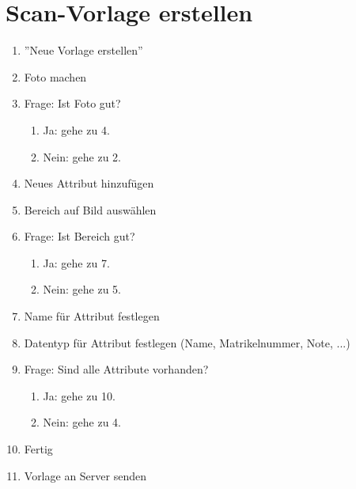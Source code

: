 \documentclass[notables, nomenclature, oneside, 150]{HSMW-Thesis}
\begin{document}
	\section*{Scan-Vorlage erstellen}
	\begin{enumerate}
		\item ''Neue Vorlage erstellen''
		\item Foto machen
		\item Frage: Ist Foto gut?
		\vspace{-5mm}
		\begin{enumerate}
			\item Ja: gehe zu 4.
			\item Nein: gehe zu 2.
		\end{enumerate}
		\item Neues Attribut hinzufügen
		\item Bereich auf Bild auswählen
		\item Frage: Ist Bereich gut?
		\vspace{-5mm}
		\begin{enumerate}
			\item Ja: gehe zu 7.
			\item Nein: gehe zu 5.
		\end{enumerate}
		\item Name für Attribut festlegen
		\item Datentyp für Attribut festlegen (Name, Matrikelnummer, Note, ...)
		\item Frage: Sind alle Attribute vorhanden?
		\vspace{-5mm}
		\begin{enumerate}
			\item Ja: gehe zu 10.
			\item Nein: gehe zu 4.
		\end{enumerate}
		\item Fertig
		\item Vorlage an Server senden
	\end{enumerate}
	
\end{document}
